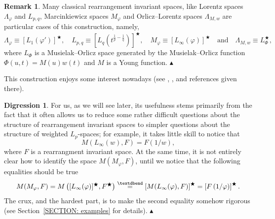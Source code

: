 \documentclass[11pt]{amsart}
\theoremstyle{definition}
\theoremstyle{definition}
\theoremstyle{definition}
\theoremstyle{definition}
\theoremstyle{definition}
\theoremstyle{definition}
\newtheorem{remark}[theorem]{Remark}
\theoremstyle{definition}
\theoremstyle{definition}
\numberwithin{equation}{section}
\numberwithin{equation}{section}
\numberwithin{equation}{section}
\theoremstyle{definition}
\theoremstyle{definition}
\theoremstyle{definition}
\theoremstyle{definition}
\newtheorem{scholium}[theorem]{Digression}
\theoremstyle{definition}
\theoremstyle{definition}
\newcommand\xqed[1]{%
	\leavevmode\unskip\penalty9999 \hbox{}\nobreak\hfill
	\quad\hbox{#1}}
\newcommand\demo{\xqed{{\Large $\blacktriangle$}}}
\begin{document}
\begin{remark}
	Many classical rearrangement invariant spaces, like Lorentz spaces $\Lambda_{\varphi}$ and $L_{p,q}$, Marcinkiewicz spaces $M_{\varphi}$
	and Orlicz--Lorentz spaces $\Lambda_{M,w}$ are particular cases of this construction, namely,
	\begin{equation*}
		\Lambda_{\varphi} \equiv \left[ L_1(\varphi') \right]^{\bigstar}, \quad L_{p,q} \equiv \left[ L_q\left( t^{\frac{1}{p} - \frac{1}{q}} \right) \right]^{\bigstar},
		\quad M_{\varphi} \equiv \left[ L_{\infty}(\varphi) \right]^{\bigstar} \quad \text{and} \quad \Lambda_{M,w} \equiv L_{\Phi}^{\bigstar},
	\end{equation*}
	where $L_{\Phi}$ is a Musielak--Orlicz space generated by the Musielak--Orlicz function $\Phi(u,t) = M(u)w(t)$ and $M$ is a Young function.
	\demo
\end{remark}

This construction enjoys some interest nowadays (see \cite{Kol16}, \cite{KLM19}, \cite{KR09} and references given there).

\begin{scholium}
	For us, as we will see later, its usefulness stems primarily from the fact that it often allows us to reduce some rather difficult
	questions about the structure of rearrangement invariant spaces to simpler questions about the structure of weighted $L_p$-spaces;
	for example, it takes little skill to notice that
	\begin{equation*}
		M(L_{\infty}(w), F) = F\left( 1/w \right),
	\end{equation*}
	where $F$ is a rearrangment invariant space. At the same time, it is not entirely clear how to identify the space
	$M(M_{\varphi},F)$, until we notice that the following equalities should be true
	\begin{equation*}
		M(M_{\varphi},F)
			= M\left( [L_{\infty}(\varphi)]^{\bigstar}, F^{\bigstar} \right)
			\overset{\textdbend}{=} \left[ M(L_{\infty}(\varphi), F) \right]^{\bigstar}
			= \left[ F\left( 1/\varphi \right) \right]^{\bigstar}.
	\end{equation*}
	The crux, and the hardest part, is to make the second equality somehow rigorous (see Section~\ref{SECTION: examples} for details).
	\demo
\end{scholium}
\end{document}
